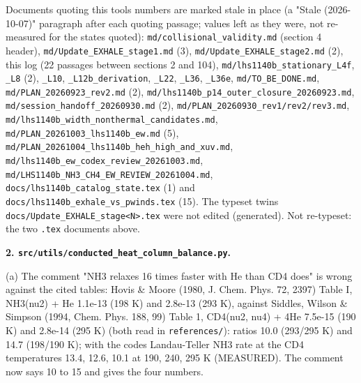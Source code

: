 \documentclass[english,a4paper]{my_memo}
\begin{document}
Documents quoting this tool\textquotesingle s numbers are marked stale in place (a "Stale
(2026-10-07)" paragraph after each quoting passage; values left as they
were, not re-measured for the states quoted): \texttt{md/collisional\_validity.md}
(section 4 header), \texttt{md/Update\_EXHALE\_stage1.md} (3), \texttt{md/Update\_EXHALE\_stage2.md}
(2), this log (22 passages between sections 2 and 104), \texttt{md/lhs1140b\_stationary\_L4f},
\texttt{\_L8} (2), \texttt{\_L10}, \texttt{\_L12b\_derivation}, \texttt{\_L22}, \texttt{\_L36}, \texttt{\_L36e},
\texttt{md/TO\_BE\_DONE.md}, \texttt{md/PLAN\_20260923\_rev2.md} (2),
\texttt{md/lhs1140b\_p14\_outer\_closure\_20260923.md}, \texttt{md/session\_handoff\_20260930.md}
(2), \texttt{md/PLAN\_20260930\_rev1/rev2/rev3.md},
\texttt{md/lhs1140b\_width\_nonthermal\_candidates.md},
\texttt{md/PLAN\_20261003\_lhs1140b\_ew.md} (5), \texttt{md/PLAN\_20261004\_lhs1140b\_heh\_high\_and\_xuv.md},
\texttt{md/lhs1140b\_ew\_codex\_review\_20261003.md},
\texttt{md/LHS1140b\_NH3\_CH4\_EW\_REVIEW\_20261004.md},
\texttt{docs/lhs1140b\_catalog\_state.tex} (1) and \texttt{docs/lhs1140b\_exhale\_vs\_pwinds.tex}
(15). The typeset twins \texttt{docs/Update\_EXHALE\_stage\textless{}N\textgreater{}.tex} were not edited
(generated). Not re-typeset: the two \texttt{.tex} documents above.

\textbf{2. \texttt{src/utils/conducted\_heat\_column\_balance.py}.}

(a) The comment "NH3 relaxes 16 times faster with He than CD4 does" is wrong
against the cited tables: Hovis \& Moore (1980, J. Chem. Phys. 72, 2397)
Table I, NH3(nu2) + He 1.1e-13 (198 K) and 2.8e-13 (293 K), against Siddles,
Wilson \& Simpson (1994, Chem. Phys. 188, 99) Table 1, CD4(nu2, nu4) + 4He
7.5e-15 (190 K) and 2.8e-14 (295 K) (both read in \texttt{references/}): ratios 10.0
(293/295 K) and 14.7 (198/190 K); with the code\textquotesingle s Landau-Teller NH3 rate at
the CD4 temperatures 13.4, 12.6, 10.1 at 190, 240, 295 K (MEASURED). The
comment now says 10 to 15 and gives the four numbers.
\end{document}
